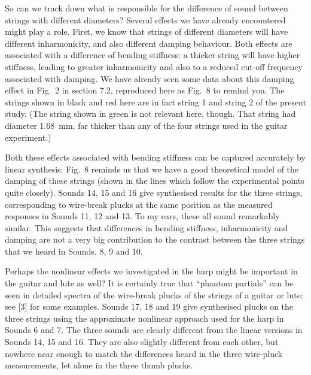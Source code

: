   So can we track down what is responsible for the difference of sound between 
  strings with different diameters? Several effects we have already encountered 
  might play a role. First, we know that strings of different diameters will 
  have different inharmonicity, and also different damping behaviour. Both 
  effects are associated with a difference of bending stiffness: a thicker 
  string will have higher stiffness, leading to greater inharmonicity and also 
  to a reduced cut-off frequency associated with damping. We have already seen 
  some data about this damping effect in Fig.\ 2 in section 7.2, reproduced 
  here as Fig.\ 8 to remind you. The strings shown in black and red here are in 
  fact string 1 and string 2 of the present study. (The string shown in green 
  is not relevant here, though. That string had diameter 1.68~mm, far thicker 
  than any of the four strings used in the guitar experiment.) 


  Both these effects associated with bending stiffness can be captured 
  accurately by linear synthesis: Fig.\ 8 reminds us that we have a good 
  theoretical model of the damping of these strings (shown in the lines which 
  follow the experimental points quite closely). Sounds 14, 15 and 16 give 
  synthesised results for the three strings, corresponding to wire-break plucks 
  at the same position as the measured responses in Sounds 11, 12 and 13. To my 
  ears, these all sound remarkably similar. This suggests that differences in 
  bending stiffness, inharmonicity and damping are not a very big contribution 
  to the contrast between the three strings that we heard in Sounds. 8, 9 and 
  10. 

  Perhaps the nonlinear effects we investigated in the harp might be important 
  in the guitar and lute as well? It is certainly true that “phantom partials” 
  can be seen in detailed spectra of the wire-break plucks of the strings of a 
  guitar or lute: see [3] for some examples. Sounds 17, 18 and 19 give 
  synthesised plucks on the three strings using the approximate nonlinear 
  approach used for the harp in Sounds 6 and 7. The three sounds are clearly 
  different from the linear versions in Sounds 14, 15 and 16. They are also 
  slightly different from each other, but nowhere near enough to match the 
  differences heard in the three wire-pluck measurements, let alone in the 
  three thumb plucks. 

